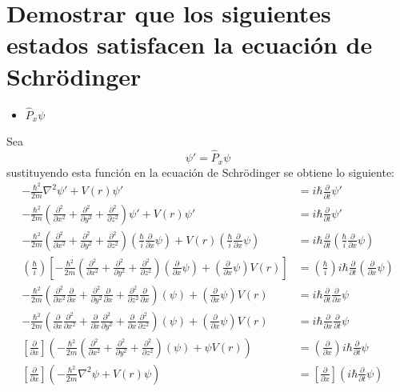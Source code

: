 \documentclass[12pt,letterpaper]{article}
\begin{document}
\section*{Demostrar que los siguientes estados satisfacen la ecuación de Schr\"odinger}
\begin{itemize}
    \item $\hat{P}_x \psi$
\end{itemize}
Sea \begin{equation}
    \label{eq:psip}
    \psi ' = \hat{P}_x \psi
\end{equation}
sustituyendo esta función en la ecuación de Schr\"odinger se obtiene lo siguiente:
\begin{align*}
    -\frac{\hbar^2}{2m} \nabla^2 {\psi}' + V(r) {\psi}' &= i\hbar\frac{\partial}{\partial t} {\psi}'\\
    - \frac{\hbar^2}{2m} \left(\frac{\partial^2}{\partial x^2} +\frac{\partial^2}{\partial y^2} +\frac{\partial^2}{\partial z^2}  \right) {\psi}' +V(r){\psi'} &= i\hbar\frac{\partial}{\partial t} {\psi}'\\
    - \frac{\hbar^2}{2m} \left(\frac{\partial^2}{\partial x^2} +\frac{\partial^2}{\partial y^2} +\frac{\partial^2}{\partial z^2}  \right) \left( \frac{\hbar}{i} \frac{\partial}{\partial x} \psi\right) +V(r)\left( \frac{\hbar}{i} \frac{\partial}{\partial x} \psi\right)&= i\hbar\frac{\partial}{\partial t} \left( \frac{\hbar}{i} \frac{\partial}{\partial x} \psi\right)\\
    \left(\frac{\hbar}{i}  \right) \left[- \frac{\hbar^2}{2m} \left(\frac{\partial^2}{\partial x^2} +\frac{\partial^2}{\partial y^2} +\frac{\partial^2}{\partial z^2}  \right) \left(\frac{\partial}{\partial x} \psi\right) +\left(\frac{\partial}{\partial x} \psi\right)V(r)\right]&= \left(\frac{\hbar}{i} \right)i\hbar\frac{\partial}{\partial t} \left(\frac{\partial}{\partial x} \psi\right)\\
    - \frac{\hbar^2}{2m} \left(\frac{\partial^2}{\partial x^2}\frac{\partial}{\partial x} +\frac{\partial^2}{\partial y^2}\frac{\partial}{\partial x} +\frac{\partial^2}{\partial z^2}\frac{\partial}{\partial x}  \right) \left(\psi\right) +\left(\frac{\partial}{\partial x} \psi\right)V(r)&=i\hbar\frac{\partial}{\partial t}\frac{\partial}{\partial x} \psi\\
    - \frac{\hbar^2}{2m} \left(\frac{\partial}{\partial x}\frac{\partial^2}{\partial x^2} +\frac{\partial}{\partial x}\frac{\partial^2}{\partial y^2} +\frac{\partial}{\partial x}\frac{\partial^2}{\partial z^2} \right) \left(\psi\right) +\left(\frac{\partial}{\partial x} \psi\right)V(r)&=i\hbar\frac{\partial}{\partial x}\frac{\partial}{\partial t} \psi\\
    \left[\frac{\partial}{\partial x} \right]\left(- \frac{\hbar^2}{2m} \left(\frac{\partial^2}{\partial x^2} +\frac{\partial^2}{\partial y^2} +\frac{\partial^2}{\partial z^2} \right) \left(\psi\right) +\psi V(r)\right)&=\left(\frac{\partial}{\partial x}\right) i\hbar\frac{\partial}{\partial t} \psi\\ 
    \left[\frac{\partial}{\partial x} \right]\left(- \frac{\hbar^2}{2m} \nabla^2 \psi +V(r)\psi \right)&=\left[\frac{\partial}{\partial x}\right]\left(i\hbar\frac{\partial}{\partial t} \psi \right)\\
\end{align*}
\end{document}
